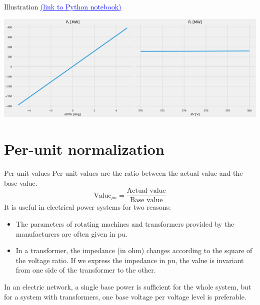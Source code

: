 \begin{frame}{Illustration \href{https://colab.research.google.com/drive/1wrJYI082Y6qE6TyaT5a7eWO1lB0CCWiu?usp=sharing}{\textcolor{blue}{\underline{(link to Python notebook)}}}
}
\begin{center}
    \includegraphics[width=\textwidth]{images/P_transfer.png}
\end{center}
    

\end{frame}

\section{Per-unit normalization}

\begin{frame}{Per-unit values}
    Per-unit values are the ratio between the actual value and the base value.
    $$
    \text{Value}_{pu} = \frac{\text{Actual value}}{\text{Base value}}
    $$
    It is useful in electrical power systems for two reasons:
    \begin{itemize}
        \item The parameters of rotating machines and transformers provided by the manufacturers are often given in pu.
        \item In a transformer, the impedance (in ohm) changes according to the square of the voltage ratio. If we express the impedance in pu, the value is invariant from one side of the transformer to the other.
    \end{itemize}
    In an electric network, a single base power is sufficient for the whole system, but for a system with transformers, one base voltage per voltage level is preferable.
\end{frame}

